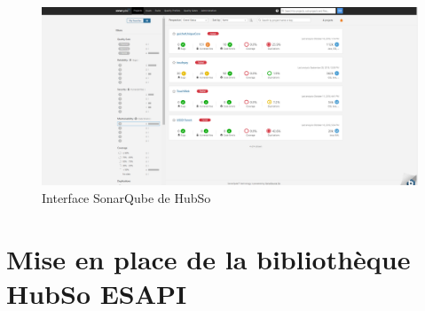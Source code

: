 \begin{figure}[H]
	\centering
	\begin{minipage}{12cm}
		\centering
		\includegraphics[width=1\textwidth]{fig/sonar.png}
	\end{minipage}
	\caption{Interface SonarQube de HubSo}
	\label{fig:vfdf}
\end{figure}

\section{Mise en place de la bibliothèque HubSo ESAPI}
